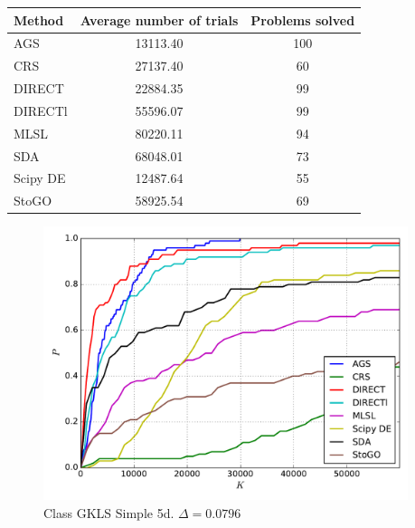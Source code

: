 \documentclass[a4paper]{article}
\begin{document}
\begin{tabular}{lcc}
\hline
 Method   &  Average number of trials  &  Problems solved  \\
\hline
 AGS      &          13113.40          &        100        \\
 CRS      &          27137.40          &        60         \\
 DIRECT   &          22884.35          &        99         \\
 DIRECTl  &          55596.07          &        99         \\
 MLSL     &          80220.11          &        94         \\
 SDA      &          68048.01          &        73         \\
 Scipy DE &          12487.64          &        55         \\
 StoGO    &          58925.54          &        69         \\
\hline
\end{tabular}
\begin{figure}[H]
  \center
  \includegraphics[width=0.95\textwidth]{../experiments/gklss5d_serg/cmc.pdf}
  \caption{Class GKLS Simple 5d. $\Delta=0.0796$}

\end{figure}
\end{document}
